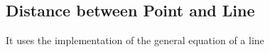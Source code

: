 \subsection{Distance between Point and Line}

It uses the implementation of the general equation of a line
